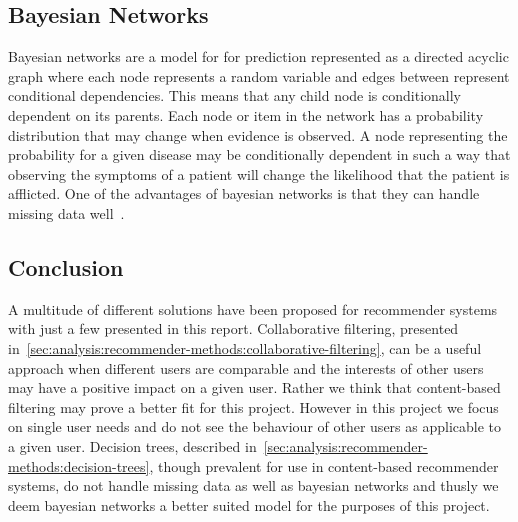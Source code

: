 \subsection{Bayesian Networks}
\label{sec:analysis:recommender-methods:bayesian-networks}

Bayesian networks are a model for for prediction represented as a directed acyclic graph where each node represents a random variable and edges between represent conditional dependencies.
This means that any child node is conditionally dependent on its parents.
Each node or item in the network has a probability distribution that may change when evidence is observed.
A node representing the probability for a given disease may be conditionally dependent in such a way that observing the symptoms of a patient will change the likelihood that the patient is afflicted.
One of the advantages of bayesian networks is that they can handle missing data well~\cite{heckerman2008tutorial}.


\subsection{Conclusion}
\label{sec:analysis:recommender-methods:conclusion}

A multitude of different solutions have been proposed for recommender systems~\cite{adomavicius2005toward} with just a few presented in this report.
Collaborative filtering, presented in~\cref{sec:analysis:recommender-methods:collaborative-filtering}, can be a useful approach when different users are comparable and the interests of other users may have a positive impact on a given user.
Rather we think that content-based filtering may prove a better fit for this project.
However in this project we focus on single user needs and do not see the behaviour of other users as applicable to a given user.
Decision trees, described in~\cref{sec:analysis:recommender-methods:decision-trees}, though prevalent for use in content-based recommender systems, do not handle missing data as well as bayesian networks and thusly we deem bayesian networks a better suited model for the purposes of this project.